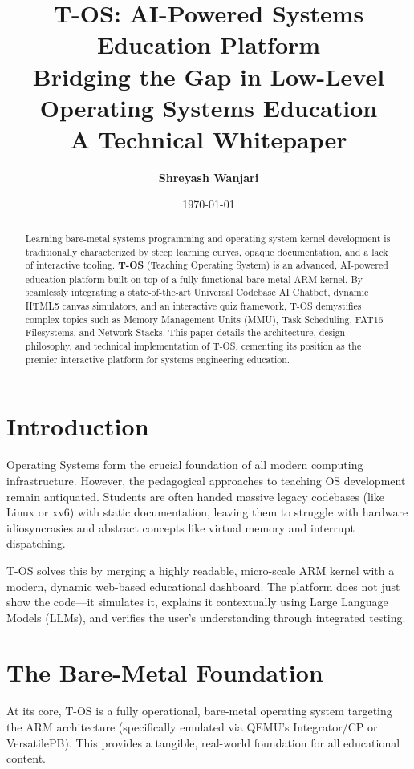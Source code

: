 \documentclass[a4paper,11pt]{article}
\title{
    \vspace{-2cm}
    \textbf{\huge T-OS: AI-Powered Systems Education Platform}\\
    \vspace{0.5cm}
    \Large Bridging the Gap in Low-Level Operating Systems Education\\
    \large A Technical Whitepaper
}
\author{\textbf{Shreyash Wanjari}}
\date{\today}
\begin{document}
\maketitle

\begin{abstract}
\noindent Learning bare-metal systems programming and operating system kernel development is traditionally characterized by steep learning curves, opaque documentation, and a lack of interactive tooling. \textbf{T-OS} (Teaching Operating System) is an advanced, AI-powered education platform built on top of a fully functional bare-metal ARM kernel. By seamlessly integrating a state-of-the-art Universal Codebase AI Chatbot, dynamic HTML5 canvas simulators, and an interactive quiz framework, T-OS demystifies complex topics such as Memory Management Units (MMU), Task Scheduling, FAT16 Filesystems, and Network Stacks. This paper details the architecture, design philosophy, and technical implementation of T-OS, cementing its position as the premier interactive platform for systems engineering education.
\end{abstract}

\vspace{0.5cm}

\section{Introduction}
Operating Systems form the crucial foundation of all modern computing infrastructure. However, the pedagogical approaches to teaching OS development remain antiquated. Students are often handed massive legacy codebases (like Linux or xv6) with static documentation, leaving them to struggle with hardware idiosyncrasies and abstract concepts like virtual memory and interrupt dispatching.

T-OS solves this by merging a highly readable, micro-scale ARM kernel with a modern, dynamic web-based educational dashboard. The platform does not just show the code—it simulates it, explains it contextually using Large Language Models (LLMs), and verifies the user's understanding through integrated testing.

\section{The Bare-Metal Foundation}
At its core, T-OS is a fully operational, bare-metal operating system targeting the ARM architecture (specifically emulated via QEMU's Integrator/CP or VersatilePB). This provides a tangible, real-world foundation for all educational content. 
\end{document}
